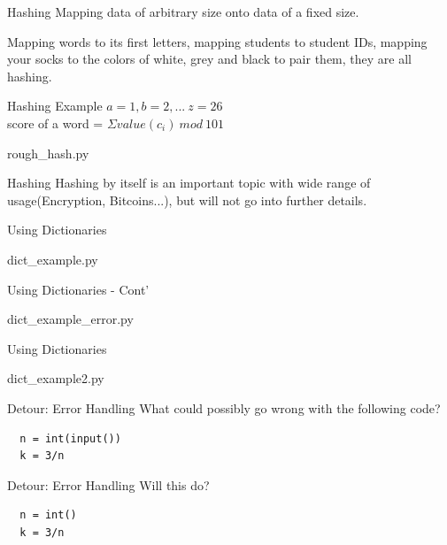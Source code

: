 \documentclass{beamer}
\begin{document}
\begin{frame}{Hashing}
  Mapping data of arbitrary size onto data of a fixed size.

  Mapping words to its first letters, mapping students to student IDs,
  mapping your socks to the colors of white, grey and black to pair them, they are all hashing.
\end{frame}

\begin{frame}{Hashing Example}
  $a=1, b=2, ...\ z=26$\\
  score of a word = $\Sigma value(c_i)\ mod\ 101$
  \begin{lstinputlisting}
    {rough_hash.py}
  \end{lstinputlisting}
\end{frame}

\begin{frame}{Hashing}
  Hashing by itself is an important topic with wide range of usage(Encryption,
  Bitcoins...), but will not go into further details.
\end{frame}

\begin{frame}{Using Dictionaries}
  \begin{lstinputlisting}
    {dict_example.py}
  \end{lstinputlisting}
\end{frame}

\begin{frame}{Using Dictionaries - Cont'}
  \begin{lstinputlisting}
    {dict_example_error.py}
  \end{lstinputlisting}
\end{frame}

\begin{frame}{Using Dictionaries}
  \begin{lstinputlisting}
    {dict_example2.py}
  \end{lstinputlisting}
\end{frame}


\begin{frame}[fragile]{Detour: Error Handling}
  What could possibly go wrong with the following code?
  \begin{lstlisting}
  n = int(input())
  k = 3/n
  \end{lstlisting}
\end{frame}

\begin{frame}[fragile]{Detour: Error Handling}
  Will this do?
  \begin{lstlisting}
  n = int()
  k = 3/n
  \end{lstlisting}
\end{frame}
\end{document}
